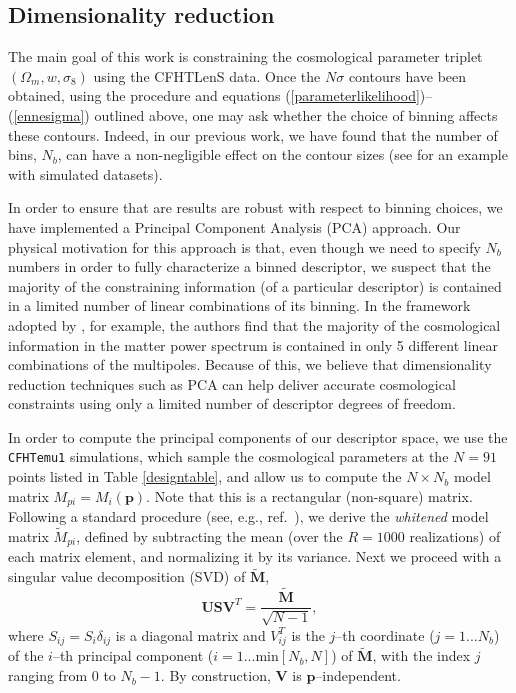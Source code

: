 \documentclass[reprint,aps,prd,superscriptaddress,showkeys,showpacs]{revtex4-1}
\begin{document}
\subsection{Dimensionality reduction}
\label{pcasection}

The main goal of this work is constraining the cosmological parameter
triplet $(\Omega_m,w,\sigma_8)$ using the CFHTLenS data.  Once the
$N\sigma$ contours have been obtained, using the procedure and
equations (\ref{parameterlikelihood})--(\ref{ennesigma}) outlined
above, one may ask whether the choice of binning affects these
contours.  Indeed, in our previous work, we have found that the number
of bins, $N_b$, can have a non-negligible effect on the contour sizes
(see \citep{Petri2013} for an example with simulated datasets).

In order to ensure that are results are robust with respect to binning
choices, we have implemented a Principal Component Analysis (PCA)
approach. Our physical motivation for this approach is that, even
though we need to specify $N_b$ numbers in order to fully characterize
a binned descriptor, we suspect that the majority of the constraining
information (of a particular descriptor) is contained in a limited
number of linear combinations of its binning. In the framework adopted
by \citep{coyote2}, for example, the authors find that the majority of
the cosmological information in the matter power spectrum is contained
in only 5 different linear combinations of the multipoles. Because of
this, we believe that dimensionality reduction techniques such as PCA
can help deliver accurate cosmological constraints using only a
limited number of descriptor degrees of freedom.

In order to compute the principal components of our descriptor space,
we use the \texttt{CFHTemu1} simulations, which sample the
cosmological parameters at the $N=91$ points listed in Table
\ref{designtable}, and allow us to compute the $N\times N_b$ model
matrix $M_{pi}=M_i(\mathbf{p})$. Note that this is a rectangular
(non-square) matrix. Following a standard procedure (see, e.g.,
ref.~\citep{astroMLText}), we derive the {\it whitened} model matrix
$\tilde{M}_{pi}$, defined by subtracting the mean (over the $R=1000$
realizations) of each matrix element,
and normalizing it by its variance. Next we proceed with a singular
value decomposition (SVD) of $\mathbf{\tilde{M}}$,
\begin{equation}
\label{svd}
\mathbf{U}\mathbf{S} \mathbf{V}^T=\frac{\mathbf{\tilde{M}}}{\sqrt{N-1}},
\end{equation}   
%
where $S_{ij}=S_i\delta_{ij}$ is a diagonal matrix and $V^T_{ij}$ is
the $j$--th coordinate ($j=1...N_b$) of the $i$--th principal
component ($i=1...\mathrm{min}[N_b,N]$) of $\mathbf{\tilde{M}}$, with
the index $j$ ranging from $0$ to $N_b-1$. By construction,
$\mathbf{V}$ is $\mathbf{p}$--independent.
\end{document}
